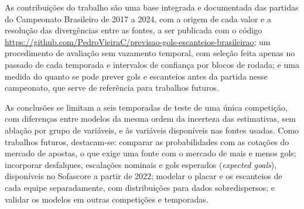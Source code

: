 As contribuições do trabalho são uma base integrada e documentada das partidas do Campeonato Brasileiro de 2017 a 2024, com a origem de cada valor e a resolução das divergências entre as fontes, a ser publicada com o código \url{https://github.com/PedroVieiraC/previsao-gols-escanteios-brasileirao}; um procedimento de avaliação sem vazamento temporal, com seleção feita apenas no passado de cada temporada e intervalos de confiança por blocos de rodada; e uma medida do quanto se pode prever gols e escanteios antes da partida nesse campeonato, que serve de referência para trabalhos futuros.

As conclusões se limitam a seis temporadas de teste de uma única competição, com diferenças entre modelos da mesma ordem da incerteza das estimativas, sem ablação por grupo de variáveis, e às variáveis disponíveis nas fontes usadas. Como trabalhos futuros, destacam-se: comparar as probabilidades com as cotações do mercado de apostas, o que exige uma fonte com o mercado de mais e menos gols; incorporar desfalques, escalações nominais e gols esperados (\textit{expected goals}), disponíveis no Sofascore a partir de 2022; modelar o placar e os escanteios de cada equipe separadamente, com distribuições para dados sobredispersos; e validar os modelos em outras competições e temporadas.
